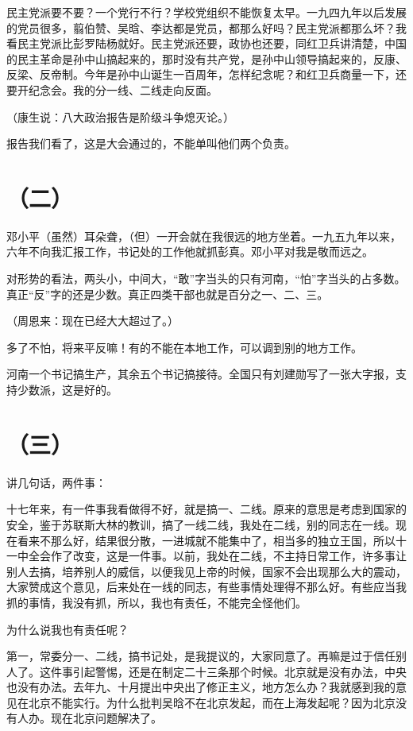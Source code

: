 民主党派要不要？一个党行不行？学校党组织不能恢复太早。一九四九年以后发展的党员很多，翦伯赞、吴晗、李达都是党员，都那么好吗？民主党派都那么坏？我看民主党派比彭罗陆杨就好。民主党派还要，政协也还要，同红卫兵讲清楚，中国的民主革命是孙中山搞起来的，那时没有共产党，是孙中山领导搞起来的，反康、反梁、反帝制。今年是孙中山诞生一百周年，怎样纪念呢？和红卫兵商量一下，还要开纪念会。我的分一线、二线走向反面。

（康生说：八大政治报告是阶级斗争熄灭论。）

报告我们看了，这是大会通过的，不能单叫他们两个负责。

\date{一九六六年十月二十五日}
\section*{（二）}

邓小平（虽然）耳朵聋，（但）一开会就在我很远的地方坐着。一九五九年以来，六年不向我汇报工作，书记处的工作他就抓彭真。邓小平对我是敬而远之。

对形势的看法，两头小，中间大，“敢”字当头的只有河南，“怕”字当头的占多数。真正“反”字的还是少数。真正四类干部也就是百分之一、二、三。

（周恩来：现在已经大大超过了。）

多了不怕，将来平反嘛！有的不能在本地工作，可以调到别的地方工作。

河南一个书记搞生产，其余五个书记搞接待。全国只有刘建勋写了一张大字报，支持少数派，这是好的。

\date{一九六六年十月二十五日}
\section*{（三）}

讲几句话，两件事：

十七年来，有一件事我看做得不好，就是搞一、二线。原来的意思是考虑到国家的安全，鉴于苏联斯大林的教训，搞了一线二线，我处在二线，别的同志在一线。现在看来不那么好，结果很分散，一进城就不能集中了，相当多的独立王国，所以十一中全会作了改变，这是一件事。以前，我处在二线，不主持日常工作，许多事让别人去搞，培养别人的威信，以便我见上帝的时候，国家不会出现那么大的震动，大家赞成这个意见，后来处在一线的同志，有些事情处理得不那么好。有些应当我抓的事情，我没有抓，所以，我也有责任，不能完全怪他们。

为什么说我也有责任呢？

第一，常委分一、二线，搞书记处，是我提议的，大家同意了。再嘛是过于信任别人了。这件事引起警惕，还是在制定二十三条那个时候。北京就是没有办法，中央也没有办法。去年九、十月提出中央出了修正主义，地方怎么办？我就感到我的意见在北京不能实行。为什么批判吴晗不在北京发起，而在上海发起呢？因为北京没有人办。现在北京问题解决了。

